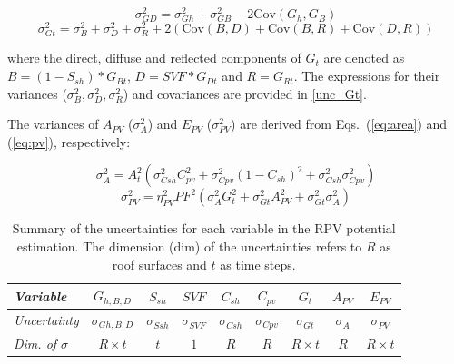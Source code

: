 \begin{equation}
\label{eq:unc_GD}
\sigma^2_{GD} = \sigma^2_{Gh} +  \sigma^2_{GB} - 2 \mathrm{Cov}(G_h, G_B) 
\end{equation}
%
\begin{equation}
\label{eq:irrad_unc}
\sigma^2_{Gt} = \sigma^2_{B} +  \sigma^2_{D} +  \sigma^2_{R} + 2 (\mathrm{Cov}(B, D) + \mathrm{Cov}(B, R) + \mathrm{Cov}(D, R))
\end{equation}

where the direct, diffuse and reflected components of $G_t$ are denoted as $B=(1 - S_{sh}) * G_{Bt}$, $D=SVF * G_{Dt}$ and $R=G_{Rt}$. The expressions for their variances ($\sigma^2_{B}, \sigma^2_{D}, \sigma^2_{R}$) and covariances are provided in \ref{unc_Gt}. 

The variances of $A_{PV}$ ($\sigma^2_A$) and $E_{PV}$ ($\sigma^2_{PV}$) are derived from Eqs.~(\ref{eq:area}) and (\ref{eq:pv}), respectively:

\begin{equation}
\label{eq:area_unc}
\sigma^2_{A}  = A_{t}^2 (\sigma^2_{Csh} C_{pv}^2 + \sigma^2_{Cpv} (1-C_{sh})^2 + \sigma^2_{Csh} \sigma^2_{Cpv}) 
\end{equation}
%
\begin{equation}
\label{eq:pv_unc}
\sigma^2_{PV}  = \eta_{PV}^2 PF^2 (\sigma^2_{A} G_{t}^2 + \sigma^2_{Gt} A_{PV}^2 + \sigma^2_{Gt} \sigma^2_{A}) 
\end{equation}

\begin{table}[tb]
\centering
\footnotesize
\begin{tabular} {lcccccccc}
\hline 
\textit{Variable}  & $G_{h,B,D}$  & $S_{sh}$  & $SVF$ & $C_{sh}$ & $C_{pv}$ & $G_t$  & $A_{PV}$ & $E_{PV}$                  \\
\hline 
\textit{Uncertainty}    & $\sigma_{Gh,B,D}$    & $\sigma_{Ssh}$     & $\sigma_{SVF}$     & $\sigma_{Csh}$  & $\sigma_{Cpv}$    & $\sigma_{Gt}$   & $\sigma_{A}$     & $\sigma_{PV}$                     \\
\textit{Dim. of $\sigma$} & $R \times t$ & $t$ & $1$   & $R$     & $R$     & $R \times t$ & $R$    & $R \times t$ \\
\hline 
\end{tabular}
\caption{Summary of the uncertainties for each variable in the RPV potential estimation. The dimension (dim) of the uncertainties refers to $R$ as roof surfaces and $t$ as time steps.}
\label{tab:uncs}
\end{table}

